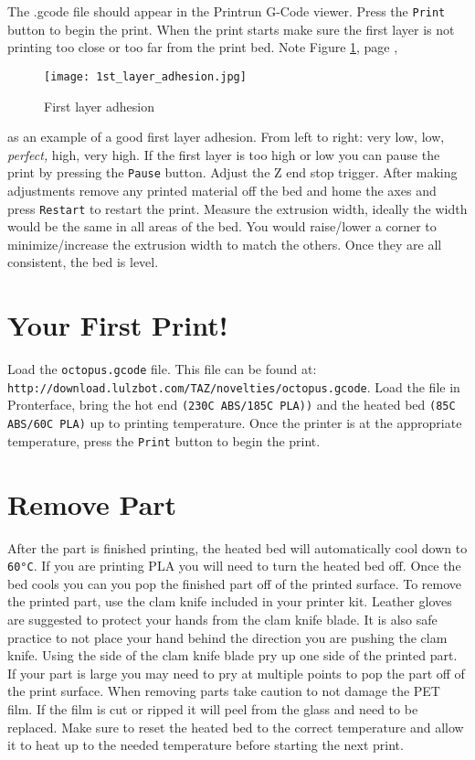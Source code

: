 The .gcode file should appear in the Printrun G-Code viewer. Press the \texttt{Print} button to begin the print. When the print starts make sure the first layer is not printing too close or too far from the print bed. Note 
Figure \ref{fig:1st_layer_adhesion}, page \pageref{fig:1st_layer_adhesion},
\begin{figure}[hbt]
\centering
\texttt{[image: 1st\_layer\_adhesion.jpg]}
\caption{First layer adhesion}
\label{fig:1st_layer_adhesion}
\end{figure}
as an example of a good first layer adhesion. From left to right: very low, low, \emph{perfect,} high, very high. If the first layer is too high or low you can pause the print by pressing the \texttt{Pause} button. Adjust the Z end stop trigger. After making adjustments remove any printed material off the bed and home the axes and press \texttt{Restart} to restart the print. Measure the extrusion width, ideally the width would be the same in all areas of the bed. You would raise/lower a corner to minimize/increase the extrusion width to match the others. Once they are all consistent, the bed is level.

\section{Your First Print!}
Load the \texttt{octopus.gcode} file.
This file can be found at:
\texttt{http://download.lulzbot.com/TAZ/novelties/octopus.gcode}. Load the file in Pronterface, bring the hot end \texttt{(230C ABS/185C PLA))} and the heated bed \texttt{(85C ABS/60C PLA)} up to printing temperature. Once the printer is at the appropriate temperature, press the \texttt{Print} button to begin the print.

\section{Remove Part}
After the part is finished printing, the heated bed will automatically cool down to \texttt{60°C}. If you are printing PLA you will need to turn the heated bed off. Once the bed cools you can you pop the finished part off of the printed surface. To remove the printed part, use the clam knife included in your printer kit. Leather gloves are suggested to protect your hands from the clam knife blade. It is also safe practice to not place your hand behind the direction you are pushing the clam knife. Using the side of the clam knife blade pry up one side of the printed part. If your part is large you may need to pry at multiple points to pop the part off of the print surface. When removing parts take caution to not damage the PET film. If the film is cut or ripped it will peel from the glass and need to be replaced. Make sure to reset the heated bed to the correct temperature and allow it to heat up to the needed temperature before starting the next print.

